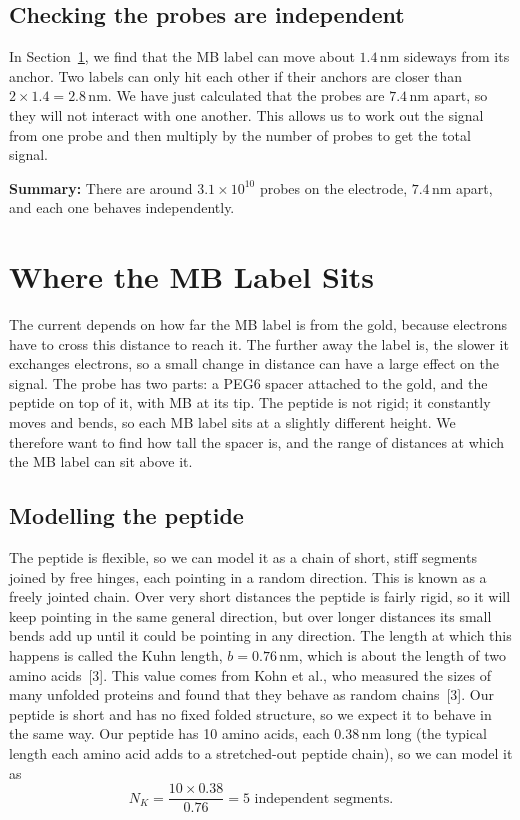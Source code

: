 \documentclass[10pt,a4paper]{article}
\numberwithin{equation}{section}
\newcommand{\cit}[1]{[#1]}
\newcommand{\nm}{\,\mathrm{nm}}
\begin{document}
\subsection*{Checking the probes are independent}
In Section~\ref{sec:label}, we find that the MB label can move about $1.4\nm$ sideways from its anchor. Two labels can only hit each other if their anchors are closer than $2\times1.4 = 2.8\nm$. We have just calculated that the probes are $7.4\nm$ apart, so they will not interact with one another. This allows us to work out the signal from one probe and then multiply by the number of probes to get the total signal.

\textbf{Summary:} There are around $3.1\times10^{10}$ probes on the electrode, $7.4\nm$ apart, and each one behaves independently.

\section{Where the MB Label Sits}
\label{sec:label}

The current depends on how far the MB label is from the gold, because electrons have to cross this distance to reach it. The further away the label is, the slower it exchanges electrons, so a small change in distance can have a large effect on the signal. The probe has two parts: a PEG6 spacer attached to the gold, and the peptide on top of it, with MB at its tip. The peptide is not rigid; it constantly moves and bends, so each MB label sits at a slightly different height. We therefore want to find how tall the spacer is, and the range of distances at which the MB label can sit above it.

\subsection*{Modelling the peptide}
The peptide is flexible, so we can model it as a chain of short, stiff segments joined by free hinges, each pointing in a random direction. This is known as a freely jointed chain. Over very short distances the peptide is fairly rigid, so it will keep pointing in the same general direction, but over longer distances its small bends add up until it could be pointing in any direction. The length at which this happens is called the Kuhn length, $b = 0.76\nm$, which is about the length of two amino acids~\cit{3}. This value comes from Kohn et al., who measured the sizes of many unfolded proteins and found that they behave as random chains~\cit{3}. Our peptide is short and has no fixed folded structure, so we expect it to behave in the same way. Our peptide has 10 amino acids, each $0.38\nm$ long (the typical length each amino acid adds to a stretched-out peptide chain), so we can model it as
\[
N_K = \frac{10\times0.38}{0.76} = 5 \text{ independent segments.}
\]
\end{document}
